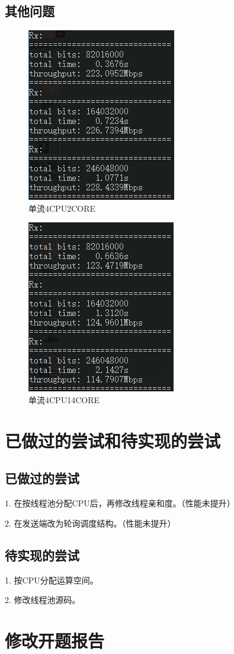 \documentclass{article}
\begin{document}
\subsection{其他问题}
\begin{figure}[H]
	\centering
	\includegraphics[width = .4\textwidth]{rxs42.png}
	\caption{单流4CPU2CORE}
\end{figure}
\begin{figure}[H]
	\centering
	\includegraphics[width = .4\textwidth]{rxs414.png}
	\caption{单流4CPU14CORE}
\end{figure}

\section{已做过的尝试和待实现的尝试}
\subsection{已做过的尝试}
1. 在按线程池分配CPU后，再修改线程亲和度。（性能未提升）

2. 在发送端改为轮询调度结构。（性能未提升）

\subsection{待实现的尝试}
1. 按CPU分配运算空间。

2. 修改线程池源码。

\section{修改开题报告}



\end{document}
